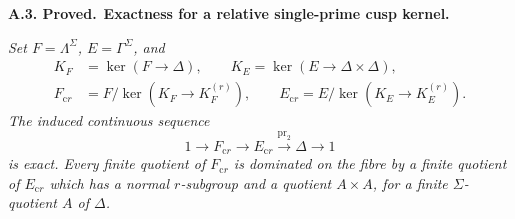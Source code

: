 \documentclass[11pt,a4paper]{article}
\newcommand{\pr}{\mathrm{pr}}
\newcommand{\crr}{\mathrm{c}r}
\newenvironment{claim}[3]{\par\medskip\noindent\hypertarget{#1}{\textbf{#1. #2.}}\ \textbf{#3.}\par\nopagebreak\smallskip\begingroup\itshape}{\endgroup\par\smallskip}
\begin{document}
\begin{claim}{A.3}{Proved}{Exactness for a relative single-prime cusp kernel}
Set $F=\Lambda^\Sigma$, $E=\Gamma^\Sigma$, and
\[
 \begin{split}
 K_F&=\ker(F\to\Delta),\qquad
 K_E=\ker(E\to\Delta\times\Delta),\\
 F_{\crr}&=F/\ker(K_F\to K_F^{(r)}),\qquad
 E_{\crr}=E/\ker(K_E\to K_E^{(r)}).
 \end{split}
\]
The induced continuous sequence
\[
 1\longrightarrow F_{\crr}\longrightarrow E_{\crr}
       \xrightarrow{\pr_2}\Delta\longrightarrow1
\]
is exact. Every finite quotient of $F_{\crr}$ is dominated on the
fibre by a finite quotient of $E_{\crr}$ which has a normal $r$-subgroup
and a quotient $A\times A$, for a finite $\Sigma$-quotient $A$ of
$\Delta$.
\end{claim}
\end{document}
